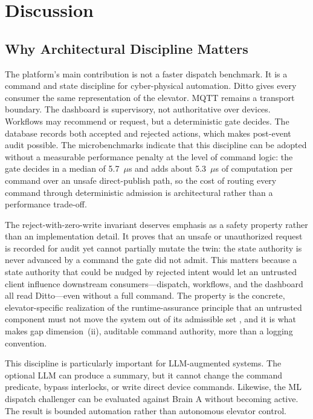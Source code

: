 \documentclass[journal]{IEEEtran}
\begin{document}
\section{Discussion}

\subsection{Why Architectural Discipline Matters}

The platform's main contribution is not a faster dispatch benchmark. It is a command and state discipline for cyber-physical automation. Ditto gives every consumer the same representation of the elevator. MQTT remains a transport boundary. The dashboard is supervisory, not authoritative over devices. Workflows may recommend or request, but a deterministic gate decides. The database records both accepted and rejected actions, which makes post-event audit possible. The microbenchmarks indicate that this discipline can be adopted without a measurable performance penalty at the level of command logic: the gate decides in a median of 5.7~$\mu$s and adds about 5.3~$\mu$s of computation per command over an unsafe direct-publish path, so the cost of routing every command through deterministic admission is architectural rather than a performance trade-off.

The reject-with-zero-write invariant deserves emphasis as a safety property rather than an implementation detail. It proves that an unsafe or unauthorized request is recorded for audit yet cannot partially mutate the twin: the state authority is never advanced by a command the gate did not admit. This matters because a state authority that could be nudged by rejected intent would let an untrusted client influence downstream consumers---dispatch, workflows, and the dashboard all read Ditto---even without a full command. The property is the concrete, elevator-specific realization of the runtime-assurance principle that an untrusted component must not move the system out of its admissible set \cite{sha2001simplex,alshiekh2018shielding,ramadge1989supervisoryControl}, and it is what makes gap dimension~(ii), auditable command authority, more than a logging convention.

This discipline is particularly important for LLM-augmented systems. The optional LLM can produce a summary, but it cannot change the command predicate, bypass interlocks, or write direct device commands. Likewise, the ML dispatch challenger can be evaluated against Brain A without becoming active. The result is bounded automation rather than autonomous elevator control.
\end{document}

